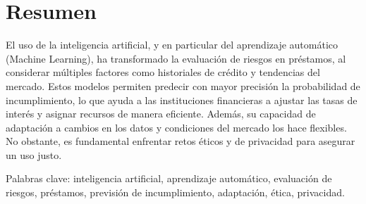 
\chapter*{Resumen}

\vspace*{-8mm}

El uso de la inteligencia artificial, y en particular del aprendizaje automático (Machine Learning), ha transformado la evaluación de riesgos en préstamos, al considerar múltiples factores como historiales de crédito y tendencias del mercado. Estos modelos permiten predecir con 
mayor precisión la probabilidad de incumplimiento, lo que ayuda
 a las instituciones financieras a ajustar las tasas de interés y asignar recursos de manera eficiente. Además, su capacidad de adaptación a cambios en los datos y condiciones del mercado los hace flexibles. No obstante, es fundamental enfrentar retos éticos y 
de privacidad para asegurar un uso justo. \medskip

Palabras clave: inteligencia artificial, aprendizaje automático, evaluación de riesgos, préstamos, previsión de incumplimiento, adaptación, ética, privacidad.

